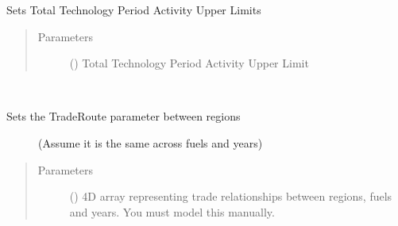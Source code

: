 \documentclass[a4paper,12pt,english]{article}
\begin{document}
\begin{fulllineitems}
\begin{fulllineitems}
\begin{quote}
\begin{description}
\end{description}\end{quote}

\end{fulllineitems}


\begin{fulllineitems}
\label{\detokenize{GOCPI:GOCPI.CreateCases.CreateCases.set_total_technology_period_activity_upper_limit}}
Sets Total Technology Period Activity Upper Limits
\begin{quote}\begin{description}
\item[{Parameters}] \leavevmode
{} (\sphinxstyleliteralemphasis{\sphinxupquote{, }}) \textendash{} Total Technology Period Activity Upper Limit

\end{description}\end{quote}

\end{fulllineitems}


\begin{fulllineitems}
\label{\detokenize{GOCPI:GOCPI.CreateCases.CreateCases.set_trade_route}}~\begin{description}
\item[{Sets the TradeRoute parameter between regions}] \leavevmode
(Assume it is the same across fuels and years)

\end{description}
\begin{quote}\begin{description}
\item[{Parameters}] \leavevmode
{} (\sphinxstyleliteralemphasis{\sphinxupquote{ ,}}) \textendash{} 4D array representing trade relationships
between regions, fuels and years. You
must model this manually.


\end{description}
\end{quote}
\end{fulllineitems}
\end{fulllineitems}
\end{document}
